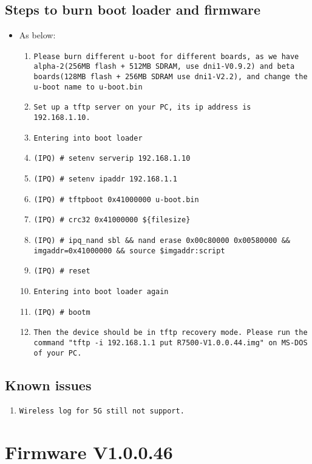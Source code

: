 \documentclass[12pt]{report}
\begin{document}
    \subsection{Steps to burn boot loader and firmware}
    \begin{itemize}
    \item As below:
            \begin{enumerate}
	    	\item \texttt{Please burn different u-boot for different boards, as we have alpha-2(256MB flash + 512MB SDRAM, use dni1-V0.9.2) and beta boards(128MB flash + 256MB SDRAM use dni1-V2.2), and change the u-boot name to u-boot.bin}
		\item \texttt{Set up a tftp server on your PC, its ip address is 192.168.1.10.}
		\item \texttt{Entering into boot loader}
		\item \texttt{(IPQ) \# setenv serverip 192.168.1.10}
		\item \texttt{(IPQ) \# setenv ipaddr 192.168.1.1}
		\item \texttt{(IPQ) \# tftpboot 0x41000000 u-boot.bin}
		\item \texttt{(IPQ) \# crc32 0x41000000 \$\{filesize\}}
		\item \texttt{(IPQ) \# ipq\_nand sbl \&\& nand erase 0x00c80000 0x00580000 \&\& imgaddr=0x41000000 \&\& source \$imgaddr:script}
		\item \texttt{(IPQ) \# reset}
		\item \texttt{Entering into boot loader again}
		\item \texttt{(IPQ) \# bootm}
		\item \texttt{Then the device should be in tftp recovery mode. Please run the command "tftp -i 192.168.1.1 put R7500-V1.0.0.44.img" on MS-DOS of your PC.}
            \end{enumerate}
    \end{itemize}

\subsection{Known issues}
            \begin{enumerate}
		\item \texttt{Wireless log for 5G still not support.}
            \end{enumerate}

\section{Firmware V1.0.0.46}
\end{document}
